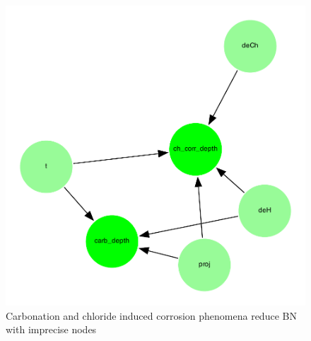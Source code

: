 \begin{figure}[H]
    \centering
    \includegraphics[width=\linewidth]{imgs/pdfs/15_total_rbn_imprecise.pdf}
    \caption{Carbonation and chloride induced corrosion phenomena reduce BN with imprecise nodes}\label{fig:imprecise_rbn}
\end{figure}

